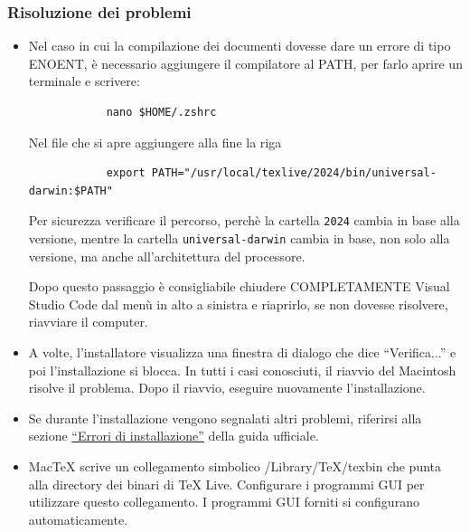 \documentclass[envcountsame,envcountchap]{svmono}
\begin{document}
\subsubsection{Risoluzione dei problemi}\label{sottosottosezione}
\begin{itemize}

    \item \label{enoent} Nel caso in cui la compilazione dei documenti 
        dovesse dare un errore di tipo ENOENT,
        è necessario aggiungere il compilatore al PATH,
        per farlo aprire un terminale e scrivere:
        \label{codice_con_minted}
        \begin{verbatim}
            nano $HOME/.zshrc
        \end{verbatim}
        Nel file che si apre aggiungere alla fine la riga
        \begin{verbatim}
            export PATH="/usr/local/texlive/2024/bin/universal-darwin:$PATH"
        \end{verbatim}
        Per sicurezza verificare il percorso, perchè la cartella {\tt 2024} cambia
         in base alla versione, mentre la cartella {\tt universal-darwin} cambia in base,
         non solo alla versione, ma anche all'architettura del processore.

        Dopo questo passaggio è consigliabile chiudere COMPLETAMENTE Visual Studio Code 
        dal menù in alto a sinistra e riaprirlo, se non dovesse risolvere, 
        riavviare il computer.


    \item A volte, l'installatore visualizza una finestra di dialogo che dice 
        “Verifica...” e poi l'installazione si blocca. In tutti i casi conosciuti, 
        il riavvio del Macintosh risolve il problema. Dopo il riavvio, 
        eseguire nuovamente l'installazione.

    \item Se durante l'installazione vengono segnalati altri problemi, riferirsi alla sezione 
        \href{https://www.tug.org/mactex/mactex-download.html}{“Errori di installazione”} della guida ufficiale.

    \item MacTeX scrive un collegamento simbolico /Library/TeX/texbin che punta 
        alla directory dei binari di TeX Live. Configurare i programmi GUI per utilizzare 
        questo collegamento. I programmi GUI forniti si configurano automaticamente.
    
\end{itemize}
\end{document}
